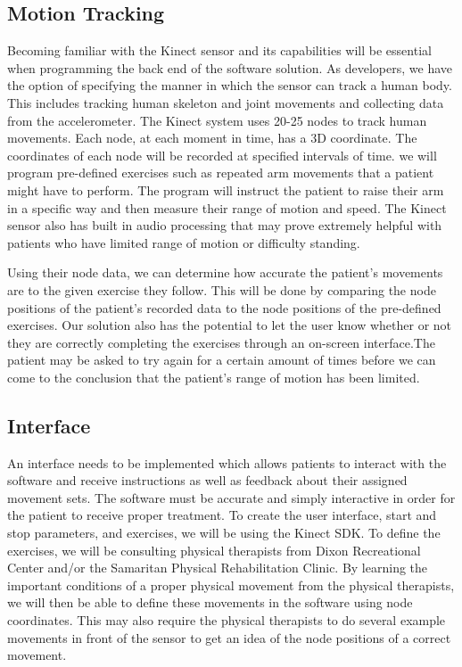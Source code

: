 \documentclass[onecolumn, draftclsnofoot,10pt, compsoc]{IEEEtran}
\begin{document}
\subsection{Motion Tracking}
Becoming familiar with the Kinect sensor and its capabilities will be essential when programming the back end of the software solution. As developers, we have the option of specifying the manner in which the sensor can track a human body. This includes tracking human skeleton and joint movements and collecting data from the accelerometer. The Kinect system uses 20-25 nodes to track human movements. Each node, at each moment in time, has a 3D coordinate. The coordinates of each node will be recorded at specified intervals of time. we will program pre-defined exercises such as repeated arm movements that a patient might have to perform. The program will instruct the patient to raise their arm in a specific way and then measure their range of motion and speed. The Kinect sensor also has built in audio processing that may prove extremely helpful with patients who have limited range of motion or difficulty standing. \par

Using their node data, we can determine how accurate the patient's movements are to the given exercise they follow. This will be done by comparing the node positions of the patient's recorded data to the node positions of the pre-defined exercises. Our solution also has the potential to let the user know whether or not they are correctly completing the exercises through an on-screen interface.The patient may be asked to try again for a certain amount of times before we can come to the conclusion that the patient's range of motion has been limited. \par

\subsection{Interface}

An interface needs to be implemented which allows patients to interact with the software and receive instructions as well as feedback about their assigned movement sets. The software must be accurate and simply interactive in order for the patient to receive proper treatment.
To create the user interface, start and stop parameters, and exercises, we will be using the Kinect SDK. To define the exercises, we will be consulting physical therapists from Dixon Recreational Center and/or the Samaritan Physical Rehabilitation Clinic. By learning the important conditions of a proper physical movement from the physical therapists, we will then be able to define these movements in the software using node coordinates. This may also require the physical therapists to do several example movements in front of the sensor to get an idea of the node positions of a correct movement. \par
\end{document}
